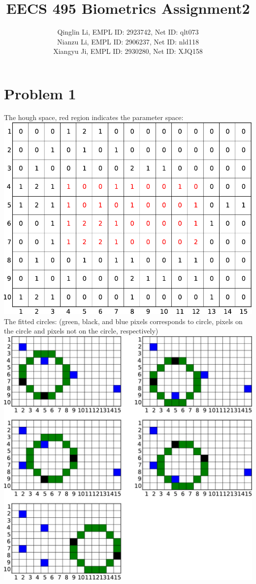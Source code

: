 \documentclass[12pt]{article}
\date{}
\title{EECS 495 Biometrics Assignment2}
\author{Qinglin Li, EMPL ID: 2923742, Net ID: qlt073\\ Nianzu Li, EMPL ID: 2906237, Net ID: nld118\\ Xiangyu Ji, EMPL ID: 2930280, Net ID: XJQ158}
\begin{document}
\maketitle
\section*{Problem 1}
The hough space, red region indicates the parameter space:\\
\includegraphics[scale =1]{p1-voting-crop}\\
The fitted circles: (green, black, and blue pixels corresponds to circle, pixels on the circle and pixels not on the circle, respectively)\\
\includegraphics[scale=0.8]{p1-circles-crop}
\end{document}
